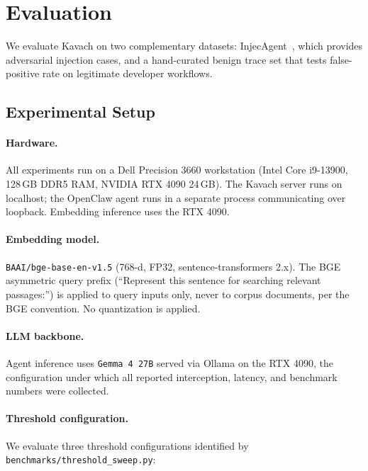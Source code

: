 
\section{Evaluation}
\label{sec:eval}

We evaluate Kavach on two complementary datasets: InjecAgent~\cite{zhan2024injecagent},
which provides adversarial injection cases, and a hand-curated benign trace
set that tests false-positive rate on legitimate developer workflows.

\subsection{Experimental Setup}

\paragraph{Hardware.}
All experiments run on a Dell Precision 3660 workstation
(Intel Core i9-13900, 128\,GB DDR5 RAM, NVIDIA RTX 4090 24\,GB).
The Kavach server runs on localhost; the OpenClaw agent runs in a separate
process communicating over loopback. Embedding inference uses the RTX 4090.

\paragraph{Embedding model.}
\texttt{BAAI/bge-base-en-v1.5} (768-d, FP32, sentence-transformers 2.x).
The BGE asymmetric query prefix (``Represent this sentence for searching
relevant passages:'') is applied to query inputs only, never to corpus
documents, per the BGE convention. No quantization is applied.

\paragraph{LLM backbone.}
Agent inference uses \texttt{Gemma\,4 27B} served via Ollama on the RTX
4090, the configuration under which all reported interception, latency, and
benchmark numbers were collected.

\paragraph{Threshold configuration.}
We evaluate three threshold configurations identified by
\texttt{benchmarks/threshold\_sweep.py}:


